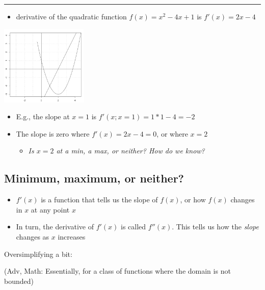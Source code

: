 \documentclass[]{article}
\providecommand{\tightlist}{%
  \setlength{\itemsep}{0pt}\setlength{\parskip}{0pt}}
\begin{document}
\begin{center}\rule{0.5\linewidth}{\linethickness}\end{center}

\begin{itemize}
\tightlist
\item
  derivative of the quadratic function \(f(x) = x^2 -4x + 1\) is \(f'(x) = 2x - 4\)
\end{itemize}

\includegraphics[height=1.5in]{picsfigs/plotaquadfncn_andderiv.png}

\begin{itemize}
\item
  E.g., the slope at \(x=1\) is \(f'(x;x=1) = 1*1 - 4 = -2\)
\item
  The slope is zero where \(f'(x)=2x-4=0\), or where \(x=2\)

  \begin{itemize}
  \tightlist
  \item
    \emph{Is \(x=2\) at a min, a max, or neither? How do we know?}
  \end{itemize}
\end{itemize}

\hypertarget{minimum-maximum-or-neither}{%
\subsection{Minimum, maximum, or neither?}\label{minimum-maximum-or-neither}}

\begin{itemize}
\tightlist
\item
  \(f'(x)\) is a function that tells us the slope of \(f(x)\), or how \(f(x)\) changes in \(x\) at any point \(x\)
\item
  In turn, the derivative of \(f'(x)\) is called \(f''(x)\). This tells us how the \emph{slope} changes as \(x\) increases
\end{itemize}

\bigskip

Oversimplifying a bit:

\textcolor{RawSienna}{(Adv, Math: Essentially, for a class of functions where the domain is not bounded)}
\end{document}

